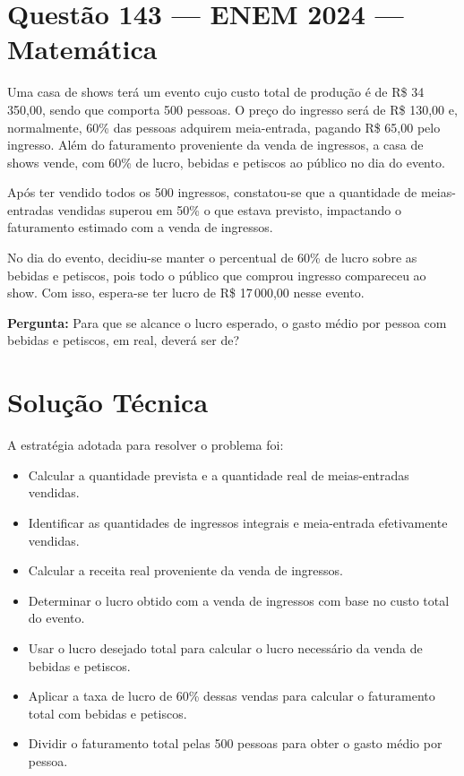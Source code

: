 \documentclass{article}
\begin{document}
\section*{Questão 143 — ENEM 2024 — Matemática}

Uma casa de shows terá um evento cujo custo total de produção é de R\$ 34\,350,00, sendo que comporta 500 pessoas. O preço do ingresso será de R\$ 130,00 e, normalmente, 60\% das pessoas adquirem meia-entrada, pagando R\$ 65,00 pelo ingresso. Além do faturamento proveniente da venda de ingressos, a casa de shows vende, com 60\% de lucro, bebidas e petiscos ao público no dia do evento.

Após ter vendido todos os 500 ingressos, constatou-se que a quantidade de meias-entradas vendidas superou em 50\% o que estava previsto, impactando o faturamento estimado com a venda de ingressos.

No dia do evento, decidiu-se manter o percentual de 60\% de lucro sobre as bebidas e petiscos, pois todo o público que comprou ingresso compareceu ao show. Com isso, espera-se ter lucro de R\$ 17\,000,00 nesse evento.

\vspace{0.5em}

\textbf{Pergunta:} Para que se alcance o lucro esperado, o gasto médio por pessoa com bebidas e petiscos, em real, deverá ser de?

\section*{Solução Técnica}

A estratégia adotada para resolver o problema foi:

\begin{itemize}
  \item Calcular a quantidade prevista e a quantidade real de meias-entradas vendidas.
  \item Identificar as quantidades de ingressos integrais e meia-entrada efetivamente vendidas.
  \item Calcular a receita real proveniente da venda de ingressos.
  \item Determinar o lucro obtido com a venda de ingressos com base no custo total do evento.
  \item Usar o lucro desejado total para calcular o lucro necessário da venda de bebidas e petiscos.
  \item Aplicar a taxa de lucro de 60\% dessas vendas para calcular o faturamento total com bebidas e petiscos.
  \item Dividir o faturamento total pelas 500 pessoas para obter o gasto médio por pessoa.
\end{itemize}
\end{document}
